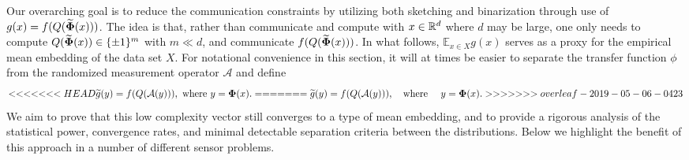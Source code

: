 Our overarching goal is to reduce the communication constraints by utilizing both sketching and binarization 
through use of $g(x) = f(Q(\widetilde{\mathbf{\Phi}}(x)))$.   
The idea is that, rather than communicate and compute with $x\in \mathbb{R}^d$ where $d$ may be large, one only needs to compute $Q(\widetilde{\mathbf{\Phi}}(x))\in \{\pm 1\}^m$ with $m\ll d$, and communicate $f(Q(\widetilde{\mathbf{\Phi}}(x)))$. In what follows, $\mathbb{E}_{x\in X} g(x)$ serves as a proxy for the empirical mean embedding of the data set $X$.  For notational convenience in this section, it will at times be easier to separate the transfer function $\phi$ from the randomized measurement operator $\mathcal{A}$ and define
\begin{equation*}
<<<<<<< HEAD
    \widetilde{g}(y) = f(Q(\mathcal{A}(y))), \textnormal{ where } y=\mathbf{\Phi}(x).
=======
    \widetilde{g}(y) = f(Q(\mathcal{A}(y))), \quad \textnormal{where } \quad y=\mathbf{\Phi}(x).
>>>>>>> overleaf-2019-05-06-0423
\end{equation*}
We aim to prove that this low complexity vector still converges to a type of mean embedding, and to provide a rigorous analysis of the statistical power, convergence rates, and minimal detectable separation criteria between the distributions.  Below we highlight the benefit of this approach in a number of different sensor problems. 

